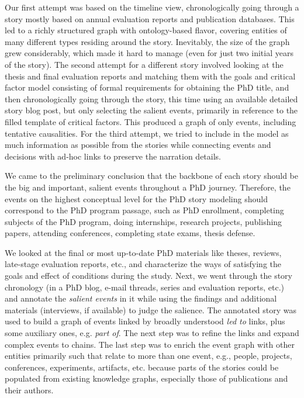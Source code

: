 \documentclass[sigconf]{acmart}
\begin{document}
Our first attempt was based on the timeline view, chronologically going through a story mostly based on annual evaluation reports and publication databases. This led to a richly structured graph with ontology-based flavor, covering entities of many different types residing around the story. Inevitably, the size of the graph grew considerably, which made it hard to manage (even for just two initial years of the story). 
%
The second attempt for a different story involved looking at the thesis and final evaluation reports and matching them with the goals and critical factor model consisting of formal requirements for obtaining the PhD title, and then chronologically going through the story, this time using an available detailed story blog post, but only selecting the salient events, primarily in reference to the filled template of critical factors. This produced a graph of only events, including tentative causalities. 
%
For the third attempt, we tried to include in the model as much information as possible from the stories while connecting events and decisions with ad-hoc links to preserve the narration details.

We came to the preliminary %
conclusion that the backbone of each story should be the big and important, salient events throughout a PhD journey. Therefore, the events on the highest conceptual level for the PhD story modeling should correspond to the PhD program passage, such as PhD enrollment, completing subjects of the PhD program, doing internships, research projects, publishing papers, attending conferences, completing state exams, thesis defense. 

We looked at the final or most up-to-date PhD materials like theses, reviews, late-stage evaluation reports, etc., and characterize the ways of satisfying the goals and effect of conditions during the study. %
Next, we went through the story chronology (in a PhD blog, e-mail threads, series and evaluation reports, etc.) and annotate the \textit{salient events} in it while using the findings and additional materials (interviews, if available) to judge the salience. The annotated story was used to build a graph of events linked by broadly understood \textit{led to} links, plus some auxiliary ones, e.g. \textit{part of}. The next step was to refine the links and expand complex events to chains. The last step was to enrich the event graph with other entities primarily such that relate to more than one event, e.g., people, projects, conferences, experiments, artifacts, etc. because parts of the stories could be populated from existing knowledge graphs, especially those of publications and their authors.
\end{document}

